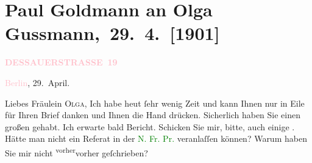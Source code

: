 

\renewcommand{\erwaehntePersonen}{Personen: Paul Goldmann, Friedrich Hebbel, Paul Marx, Felix Salten, Olga Schnitzler, Elisabeth Steinrück}
\renewcommand{\erwaehnteInstitutionen}{Institutionen: Jung-Wiener Theater zum Lieben Augustin}
\renewcommand{\erwaehnteOrte}{Orte: Berlin, Dessauer Straße, Konservatorium der Gesellschaft der Musikfreunde, Wien}
\renewcommand{\erwaehnteWerke}{Werke: Maria Magdalena. Ein bürgerliches Trauerspiel in drei Akten, Neue Freie Presse}
\section[ Paul Goldmann an Olga Gussmann, 29. 4. {[}1901{]}]{Paul Goldmann an Olga Gussmann, 29. 4. {[}1901{]}}
\nopagebreak{}
\rehead{ }\normalsize\beginnumbering{}
\toendnotes[C]{\smallbreak\pagebreak[2]}
\toendnotes[C]{\smallbreak}
\pstart
           \noindent{}\raggedleft{}{\pb}\textcolor{gray}{\textbf{\textcolor{pink}{DESSAUERSTRASSE 19}{}\ledrightnote{\textcolor{pink}{Dessauer Straße}}}}\pend
           
\pstart
           \textcolor{pink}{Berlin}{}\ledrightnote{\textcolor{pink}{Berlin}}, 29. April.\pend
           
\pstart\center{}Liebes Fräulein \textsc{Olga},\pend
\pstart
           Ich habe heut ſehr wenig Zeit und kann Ihnen nur in
               Eile für Ihren Brief danken und Ihnen die Hand drücken. Sicherlich haben Sie einen
               großen \label{K_L03530-1v}\label{K_L03530-1h} gehabt. Ich
               erwarte bald Bericht. Schicken Sie mir, bitte, auch einige \label{K_L03530-2v}\label{K_L03530-2h}. Hätte man nicht ein Referat in der \textcolor{green}{N. Fr.
                  Pr.}{}\ledrightnote{\textcolor{green}{Neue Freie Presse}} veranlaſſen können? Warum haben Sie mir nicht \substVorne{}\textsuperscript{vorher}{\allowbreak}\substDazwischen{}vorher\substHinten{} geſchrieben?\pend
           
